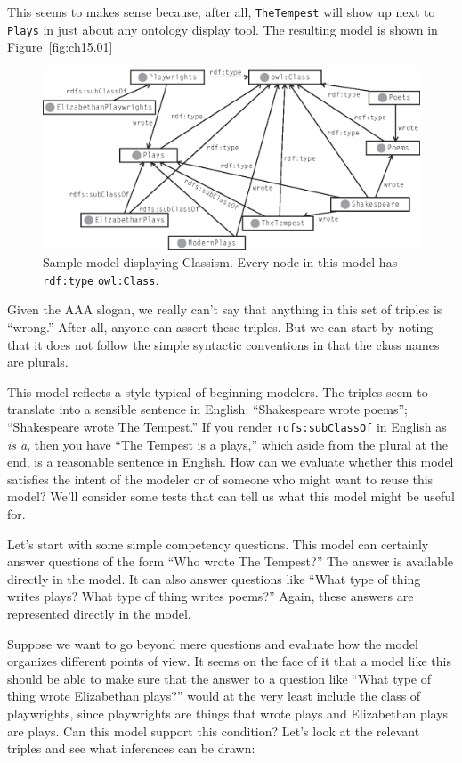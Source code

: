 This seems to makes sense because, after all, \texttt{TheTempest} will show up
next to \texttt{Plays} in just about any ontology display tool. The resulting
model is shown in Figure~\ref{fig:ch15.01}


\begin{figure}
\centering
\includegraphics[width=5in]{media/ch15/f15-01.eps}
\caption{Sample model displaying Classism. Every node in this model has
\texttt{rdf:type} \texttt{owl:Class}.
}
\label{fig:ch14.01}
\end{figure}


Given the AAA slogan, we really can't say that anything in this set of
triples is ``wrong.'' After all, anyone can assert these triples. But we
can start by noting that it does not follow the simple syntactic
conventions in that the class names are plurals.

This model reflects a style typical of beginning modelers. The triples
seem to translate into a sensible sentence in English: ``Shakespeare
wrote poems''; ``Shakespeare wrote The Tempest.'' If you render
\texttt{rdfs:subClassOf} in English as \emph{is a}, then you have ``The Tempest is a
plays,'' which aside from the plural at the end, is a reasonable
sentence in English. How can we evaluate whether this model satisfies
the intent of the modeler or of someone who might want to reuse this
model? We'll consider some tests that can tell us what this model might
be useful for.

Let's start with some simple competency questions. This model can
certainly answer questions of the form ``Who wrote The Tempest?'' The
answer is available directly in the model. It can also answer questions
like ``What type of thing writes plays? What type of thing writes
poems?'' Again, these answers are represented directly in the model.

Suppose we want to go beyond mere questions and evaluate how the model
organizes different points of view. It seems on the face of it that a
model like this should be able to make sure that the answer to a
question like ``What type of thing wrote Elizabethan plays?'' would at
the very least include the class of playwrights, since playwrights are
things that wrote plays and Elizabethan plays are plays. Can this model
support this condition? Let's look at the relevant triples and see what
inferences can be drawn:

